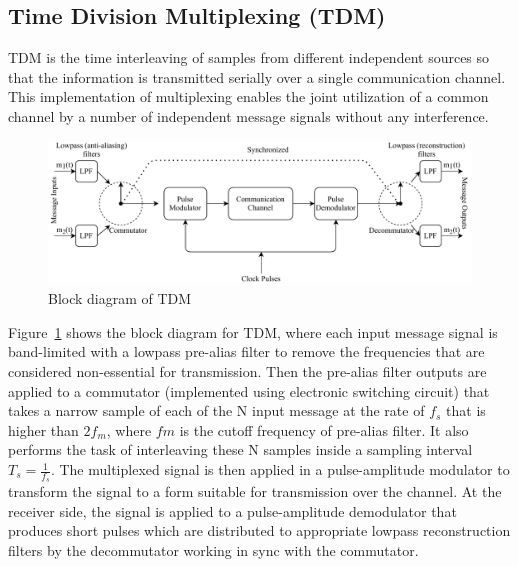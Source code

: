 \documentclass{lab_sheet}
\newcommand\ddfrac[2]{\frac{\displaystyle #1}{\displaystyle #2}}
\begin{document}
\subsection{Time Division Multiplexing (TDM)}
TDM is the time interleaving of samples from different independent sources so that the information is transmitted serially over a single communication channel. This implementation of multiplexing enables the joint utilization of a common channel by a number of independent message signals without any interference.
\begin{figure}[H]
    \centering
    \includegraphics[width=\linewidth]{../Figures/tdm_block}
    \caption{Block diagram of TDM}
    \label{fig:tdm_block}
\end{figure}
Figure~\ref{fig:tdm_block} shows the block diagram for TDM, where each input message signal is band-limited with a lowpass pre-alias filter to remove the frequencies that are considered non-essential for transmission. Then the pre-alias filter outputs are applied to a commutator (implemented using electronic switching circuit) that takes a narrow sample of each of the N input message at the rate of $f_s$ that is higher than $2f_m$, where $fm$ is the cutoff frequency of pre-alias filter. It also performs the task of interleaving these N samples inside a sampling interval $T_s=\ddfrac{1}{f_s}$. The multiplexed signal is then applied in a pulse-amplitude modulator to transform the signal to a form suitable for transmission over the channel. At the receiver side, the signal is applied to a pulse-amplitude demodulator that produces short pulses which are distributed to appropriate lowpass reconstruction filters by the decommutator working in sync with the commutator.
\end{document}
